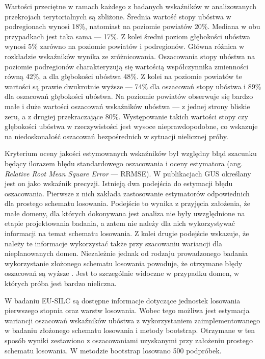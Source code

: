 Wartości przeciętne w ramach każdego z badanych wskaźników w analizowanych przekrojach terytorialnych są zbliżone. Średnia wartość stopy ubóstwa w podregionach wynosi 18\%, natomiast na poziomie powiatów 20\%. Mediana w obu przypadkach jest taka sama --- 17\%. Z kolei średni poziom głębokości ubóstwa wynosi 5\% zarówno na poziomie powiatów i podregionów. Główna różnica w rozkładzie wskaźników wynika ze zróżnicowania. Oszacowania stopy ubóstwa na poziomie podregionów charakteryzują się wartością współczynnika zmienności równą 42\%, a dla głębokości ubóstwa 48\%. Z kolei na poziomie powiatów te wartości są prawie dwukrotnie wyższe --- 74\% dla oszacowań stopy ubóstwa i 89\% dla oszacowań głębokości ubóstwa. Na poziomie powiatów obserwuje się bardzo małe i duże wartości oszacowań wskaźników ubóstwa --- z jednej strony bliskie zeru, a z drugiej przekraczające 80\%. Występowanie takich wartości stopy czy głębokości ubóstwa w rzeczywistości jest wysoce nieprawdopodobne, co wskazuje na niedoskonałość oszacowań bezpośrednich w sytuacji nielicznej próby.

Kryterium oceny jakości estymowanych wskaźników był względny błąd szacunku będący ilorazem błędu standardowego oszacowania i oceny estymatora (ang. \textit{Relative Root Mean Square Error} --- RRMSE). W publikacjach GUS określany jest on jako wskaźnik precyzji. Istnieją dwa podejścia do estymacji błędu oszacowania. Pierwsze z nich zakłada zastosowanie estymatorów odpowiednich dla prostego schematu losowania. Podejście to wynika z przyjęcia założenia, że małe domeny, dla których dokonywana jest analiza nie były uwzględnione na etapie projektowania badania, a zatem nie należy dla nich wykorzystywać informacji na temat schematu losowania. Z kolei drugie podejście wskazuje, że należy te informacje wykorzystać także przy szacowaniu wariancji dla nieplanowanych domen. Niezależnie jednak od rodzaju prowadzonego badania wykorzystanie złożonego schematu losowania powoduje, że otrzymane błędy oszacowań są wyższe \citep{lehtonen2004}. Jest to szczególnie widoczne w przypadku domen, w których próba jest bardzo nieliczna.

W badaniu EU-SILC są dostępne informacje dotyczące jednostek losowania pierwszego stopnia oraz warstw losowania. Wobec tego możliwa jest estymacja wariancji oszacowań wskaźników ubóstwa z wykorzystaniem zaimplementowanego w badaniu złożonego schematu losowania i metody bootstrap. Otrzymane w ten sposób wyniki zestawiono z oszacowaniami uzyskanymi przy założeniu prostego schematu losowania. W metodzie bootstrap losowano 500 podpróbek.

